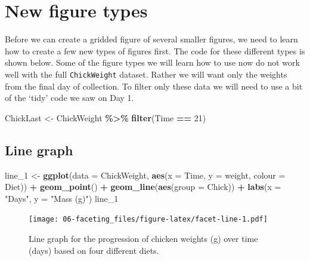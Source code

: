 \documentclass[
]{book}
\newenvironment{Shaded}{\begin{snugshade}}{\end{snugshade}}
\newcommand{\DataTypeTok}[1]{\textcolor[rgb]{0.13,0.29,0.53}{#1}}
\newcommand{\DecValTok}[1]{\textcolor[rgb]{0.00,0.00,0.81}{#1}}
\newcommand{\KeywordTok}[1]{\textcolor[rgb]{0.13,0.29,0.53}{\textbf{#1}}}
\newcommand{\NormalTok}[1]{#1}
\newcommand{\OperatorTok}[1]{\textcolor[rgb]{0.81,0.36,0.00}{\textbf{#1}}}
\newcommand{\StringTok}[1]{\textcolor[rgb]{0.31,0.60,0.02}{#1}}
\begin{document}
\hypertarget{new-figure-types}{%
\section{New figure types}\label{new-figure-types}}

Before we can create a gridded figure of several smaller figures, we need to learn how to create a few new types of figures first. The code for these different types is shown below. Some of the figure types we will learn how to use now do not work well with the full \texttt{ChickWeight} dataset. Rather we will want only the weights from the final day of collection. To filter only these data we will need to use a bit of the `tidy' code we saw on Day 1.

\begin{Shaded}
\begin{Highlighting}[]
\NormalTok{ChickLast <{-}}\StringTok{ }\NormalTok{ChickWeight }\OperatorTok{\%>\%}\StringTok{ }
\StringTok{  }\KeywordTok{filter}\NormalTok{(Time }\OperatorTok{==}\StringTok{ }\DecValTok{21}\NormalTok{)}
\end{Highlighting}
\end{Shaded}

\hypertarget{line-graph}{%
\subsection{Line graph}\label{line-graph}}

\begin{Shaded}
\begin{Highlighting}[]
\NormalTok{line\_}\DecValTok{1}\NormalTok{ <{-}}\StringTok{ }\KeywordTok{ggplot}\NormalTok{(}\DataTypeTok{data =}\NormalTok{ ChickWeight, }\KeywordTok{aes}\NormalTok{(}\DataTypeTok{x =}\NormalTok{ Time, }\DataTypeTok{y =}\NormalTok{ weight, }\DataTypeTok{colour =}\NormalTok{ Diet)) }\OperatorTok{+}
\StringTok{  }\KeywordTok{geom\_point}\NormalTok{() }\OperatorTok{+}
\StringTok{  }\KeywordTok{geom\_line}\NormalTok{(}\KeywordTok{aes}\NormalTok{(}\DataTypeTok{group =}\NormalTok{ Chick)) }\OperatorTok{+}
\StringTok{  }\KeywordTok{labs}\NormalTok{(}\DataTypeTok{x =} \StringTok{"Days"}\NormalTok{, }\DataTypeTok{y =} \StringTok{"Mass (g)"}\NormalTok{)}
\NormalTok{line\_}\DecValTok{1}
\end{Highlighting}
\end{Shaded}

\begin{figure}
\centering
\texttt{[image: 06-faceting\_files/figure-latex/facet-line-1.pdf]}
\caption{\label{fig:facet-line}Line graph for the progression of chicken weights (g) over time (days) based on four different diets.}
\end{figure}
\end{document}
